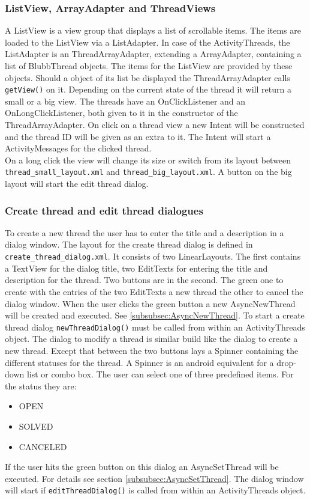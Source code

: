 \documentclass[12pt,a4paper,oneside]{report}
\newcommand{\code}[1]{\lstinline{#1}}
\begin{document}
\subsubsection{ListView, ArrayAdapter and ThreadViews}
A ListView is a view group that displays a list of scrollable items\citep{aDefListView}. The items are loaded to the ListView via a ListAdapter. In case of the ActivityThreads, the ListAdapter is an ThreadArrayAdapter, extending a ArrayAdapter, containing a list of BlubbThread objects. The items for the ListView are provided by these objects. Should a object of its list be displayed the ThreadArrayAdapter calls \code{getView()} on it. Depending on the current state of the thread it will return a small or a big view. The threads have an OnClickListener and an OnLongClickListener, both given to it in the constructor of the ThreadArrayAdapter. On click on a thread view a new Intent will be constructed and the thread ID will be given as an extra to it. The Intent will start a ActivityMessages for the clicked thread.\\
On a long click the view will change its size or switch from its layout between \code{thread_small_layout.xml} and \code{thread_big_layout.xml}. A button on the big layout will start the edit thread dialog.
\subsubsection{Create thread and edit thread dialogues}
To create a new thread the user has to enter the title and a description in a dialog window. The layout for the create thread dialog is defined in \code{create_thread_dialog.xml}. It consists of two LinearLayouts. The first contains a TextView for the dialog title, two EditTexts for entering the title and description for the thread. Two buttons are in the second. The green one to create with the entries of the two EditTexts a new thread the other to cancel the dialog window. When the user clicks the green button a new AsyncNewThread will be created and executed. See \ref{subsubsec:AsyncNewThread}. To start a create thread dialog \code{newThreadDialog()} must be called from within an ActivityThreads object.
The dialog to modify a thread is similar build like the dialog to create a new thread. Except that between the two buttons lays a Spinner containing the different statuses for the thread. A Spinner is an android equivalent for a drop-down list or combo box. The user can select one of three predefined items. For the status they are:
\begin{itemize}
\item OPEN
\item SOLVED
\item CANCELED
\end{itemize}
If the user hits the green button on this dialog an AsyncSetThread will be executed. For details see section \ref{subsubsec:AsyncSetThread}. The dialog window will start if \code{editThreadDialog()} is called from within an ActivityThreads object.
\end{document}

